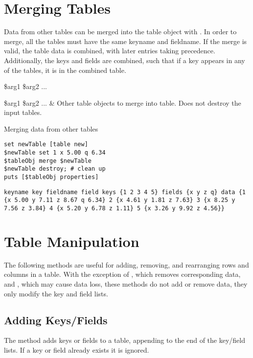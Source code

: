 \documentclass{article}
\begin{document}
\section{Merging Tables}
Data from other tables can be merged into the table object with . 
In order to merge, all the tables must have the same keyname and fieldname. 
If the merge is valid, the table data is combined, with later entries taking precedence. 
Additionally, the keys and fields are combined, such that if a key appears in any of the tables, it is in the combined table.

\begin{syntax}
 \$arg1 \$arg2 ...
\end{syntax}
\begin{args}
\$arg1 \$arg2 ... & Other table objects to merge into table. Does not destroy the input tables. 
\end{args}

\begin{example}{Merging data from other tables}
\begin{lstlisting}
set newTable [table new]
$newTable set 1 x 5.00 q 6.34
$tableObj merge $newTable
$newTable destroy; # clean up
puts [$tableObj properties]
\end{lstlisting}
\tcblower
\begin{lstlisting}
keyname key fieldname field keys {1 2 3 4 5} fields {x y z q} data {1 {x 5.00 y 7.11 z 8.67 q 6.34} 2 {x 4.61 y 1.81 z 7.63} 3 {x 8.25 y 7.56 z 3.84} 4 {x 5.20 y 6.78 z 1.11} 5 {x 3.26 y 9.92 z 4.56}}
\end{lstlisting}
\end{example}
\clearpage
\section{Table Manipulation}
The following methods are useful for adding, removing, and rearranging rows and columns in a table.
With the exception of , which removes corresponding data, and , which may cause data loss, these methods do not add or remove data, they only modify the key and field lists. 

\subsection{Adding Keys/Fields}
The method  adds keys or fields to a table, appending to the end of the key/field lists. If a key or field already exists it is ignored.
\end{document}
